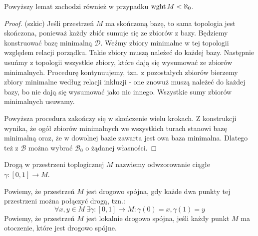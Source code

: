 \begin{fact}
  Powyższy lemat zachodzi również w przypadku $\operatorname{wght} M < \aleph_0$.
  \begin{proof}(szkic)
    Jeśli przestrzeń $M$ ma skończoną bazę, to sama topologia jest skończona, ponieważ każdy zbiór sumuje się ze zbiorów z bazy. Będziemy konstruować bazę minimalną $\mathcal D$. Weźmy zbiory minimalne w tej topologii względem relacji porządku. Takie zbiory muszą należeć do każdej bazy. Następnie usuńmy z topologii wszystkie zbiory, które dają się wysumować ze zbiorów minimalnych. Procedurę kontynuujemy, tzn. z pozostałych zbiorów bierzemy zbiory minimalne według relacji inkluzji - one znowuż muszą należeć do każdej bazy, bo nie dają się wysumować jako nic innego. Wszystkie sumy zbiorów minimalnych usuwamy.
    
    Powyższa procedura zakończy się w skończenie wielu krokach. Z konstrukcji wynika, że ogół zbiorów minimalnych we wszystkich turach stanowi bazę minimalną oraz, że w dowolnej bazie zawarta jest owa baza minimalna. Dlatego też z $\mathcal B$ można wybrać $\mathcal B_0$ o żądanej własności.
  \end{proof}
\end{fact}

\begin{df}
  Drogą w przestrzeni toplogicznej $M$ nazwiemy odwzorowanie ciągłe $\gamma: [0,1] \to M$.
\end{df}
\begin{df}
  Powiemy, że przestrzeń $M$ jest drogowo spójna, gdy każde dwa punkty tej przestrzeni można połączyć drogą, tzn.:
  \[
    \forall x,y \in M\ \exists \gamma: [0,1] \to M: \gamma(0) = x, \gamma(1) = y
  \]
  Powiemy, że przestrzeń $M$ jest lokalnie drogowo spójna, jeśli każdy punkt $M$ ma otoczenie, które jest drogowo spójne.

\end{df}


